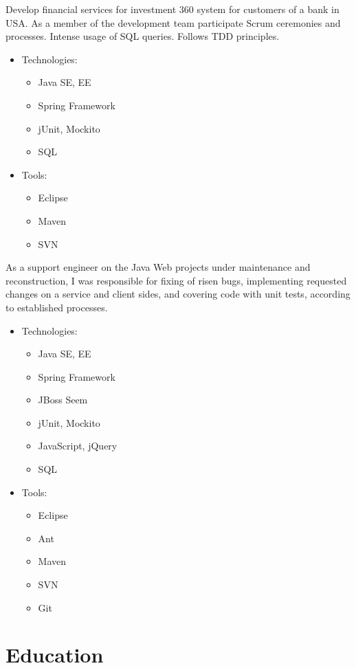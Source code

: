 \documentclass[11pt, a4paper]{moderncv}
\begin{document}
{Develop financial services for investment 360 system for customers of a bank in USA. As a member of the development team participate Scrum ceremonies and processes. Intense usage of SQL queries. Follows TDD principles.
\begin{itemize}
\item Technologies:
\begin{itemize}
\item Java SE, EE
\item Spring Framework
\item jUnit, Mockito
\item SQL
\end{itemize}
\item Tools:
\begin{itemize}
\item Eclipse
\item Maven
\item SVN
\end{itemize}
\end{itemize}}

{As a support engineer on the Java Web projects under maintenance and reconstruction, I was responsible for fixing of risen bugs, implementing requested changes on a service and client sides, and covering code with unit tests, according to established processes.
\begin{itemize}
\item Technologies:
\begin{itemize}
\item Java SE, EE
\item Spring Framework
\item JBoss Seem
\item jUnit, Mockito
\item JavaScript, jQuery
\item SQL
\end{itemize}
\item Tools:
\begin{itemize}
\item Eclipse
\item Ant
\item Maven
\item SVN
\item Git
\end{itemize}
\end{itemize}}


\section{Education}
{}
{}
\end{document}

